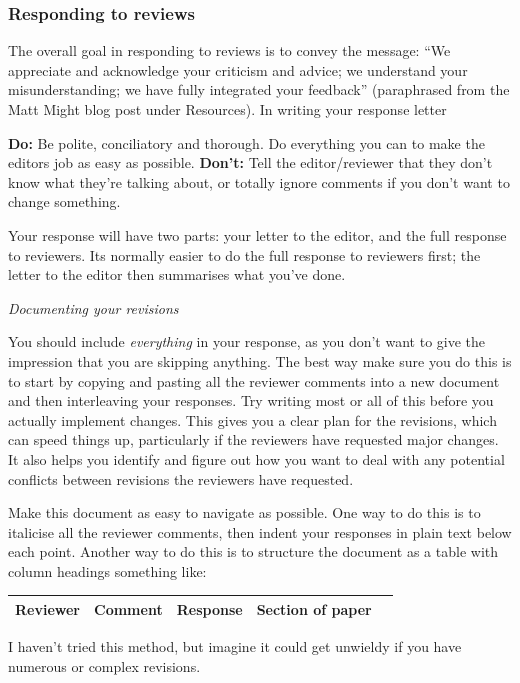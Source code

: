 \documentclass[11pt,]{article}
\begin{document}
\subsubsection{Responding to reviews}\label{responding-to-reviews}

The overall goal in responding to reviews is to convey the message: ``We
appreciate and acknowledge your criticism and advice; we understand your
misunderstanding; we have fully integrated your feedback'' (paraphrased
from the Matt Might blog post under Resources). In writing your response
letter

\textbf{Do:} Be polite, conciliatory and thorough. Do everything you can
to make the editors job as easy as possible.\newline{} \textbf{Don't:}
Tell the editor/reviewer that they don't know what they're talking
about, or totally ignore comments if you don't want to change something.

Your response will have two parts: your letter to the editor, and the
full response to reviewers. Its normally easier to do the full response
to reviewers first; the letter to the editor then summarises what you've
done. \bigskip{}

\emph{Documenting your revisions}

You should include \emph{everything} in your response, as you don't want
to give the impression that you are skipping anything. The best way make
sure you do this is to start by copying and pasting all the reviewer
comments into a new document and then interleaving your responses. Try
writing most or all of this before you actually implement changes. This
gives you a clear plan for the revisions, which can speed things up,
particularly if the reviewers have requested major changes. It also
helps you identify and figure out how you want to deal with any
potential conflicts between revisions the reviewers have requested.

Make this document as easy to navigate as possible. One way to do this
is to italicise all the reviewer comments, then indent your responses in
plain text below each point. Another way to do this is to structure the
document as a table with column headings something like:

\begin{tabular}{ | l | c | c | c | r | }
\hline
    Reviewer & Comment & Response & Section of paper\\
\hline
\end{tabular}

I haven't tried this method, but imagine it could get unwieldy if you
have numerous or complex revisions.
\end{document}

